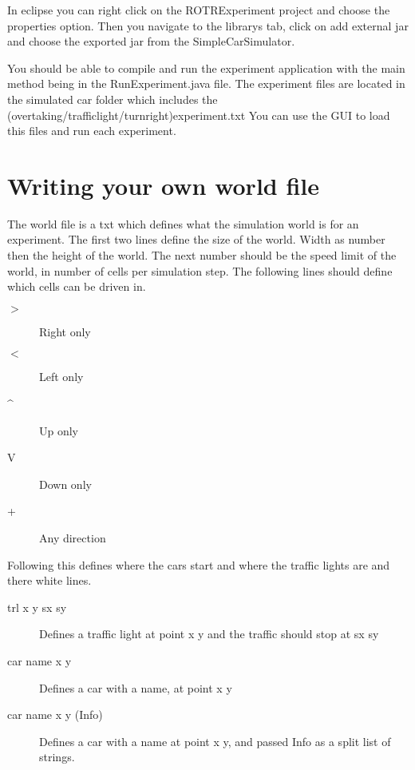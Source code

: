 \documentclass{article}
\begin{document}
In eclipse you can right click on the ROTRExperiment project and choose the properties option. 
Then you navigate to the librarys tab, click on add external jar and choose the exported jar from the SimpleCarSimulator.

You should be able to compile and run the experiment application with the main method being in the RunExperiment.java file.
The experiment files are located in the simulated car folder which includes the (overtaking/trafficlight/turnright)experiment.txt
You can use the GUI to load this files and run each experiment.

\section{Writing your own world file}
The world file is a txt which defines what the simulation world is for an experiment.
The first two lines define the size of the world.
Width as number then the height of the world.
The next number should be the speed limit of the world, in number of cells per simulation step.
The following lines should define which cells can be driven in.
\begin{description}
    \item[$>$] Right only
    \item[$<$] Left only
    \item[\^] Up only
    \item[V] Down only
    \item[+] Any direction     
\end{description}

Following this defines where the cars start and where the traffic lights are and there white lines.
\begin{description}
    \item[trl x y sx sy] Defines a traffic light at point x y and the traffic should stop at sx sy
    \item[car name x y] Defines a car with a name, at point x y
    \item[car name x y (Info)] Defines a car with a name at point x y, and passed Info as a split list of strings. 
\end{description}
\end{document}
